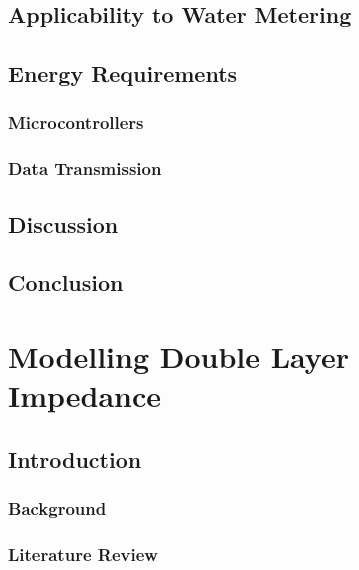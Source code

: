     

  \chapter{Applicability to Water Metering}
    \label{chap:wirelessWaterMetering}
    

  \chapter{Energy Requirements}
    \label{chap:energyRequirements}

    \section{Microcontrollers}

    \section{Data Transmission}
        

  \chapter{Discussion}
  \label{chap:part_1_discussion}

  \chapter{Conclusion}
  \label{chap:part_1_conclusion}


\part{Modelling Double Layer Impedance}
  \label{part:doubleLayersOnConductors}
  \chapter{Introduction}
    \section{Background}
    \section{Literature Review}

